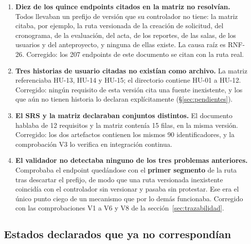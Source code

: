 \documentclass[11pt,a4paper]{article}
\begin{document}
\begin{enumerate}
    \item \textbf{Diez de los quince endpoints citados en la matriz no resolvían.} Todos
          llevaban un prefijo de versión que su controlador no tiene: la matriz citaba, por
          ejemplo, la ruta versionada de la creación de solicitud, del cronograma, de la
          evaluación, del acta, de los reportes, de las salas, de los usuarios y del
          anteproyecto, y ninguna de ellas existe. La causa raíz es RNF-26. Corregido: los 207
          endpoints de este documento se citan con la ruta real.
    \item \textbf{Tres historias de usuario citadas no existían como archivo.} La matriz
          referenciaba HU-13, HU-14 y HU-15; el directorio contiene HU-01 a HU-12. Corregido:
          ningún requisito de esta versión cita una fuente inexistente, y los que aún no tienen
          historia lo declaran explícitamente (\S\ref{sec:pendientes}).
    \item \textbf{El SRS y la matriz declaraban conjuntos distintos.} El documento hablaba de 12
          requisitos y la matriz contenía 15 filas, en la misma versión. Corregido: los dos
          artefactos contienen los mismos 90 identificadores, y la comprobación V3 lo verifica en
          integración continua.
    \item \textbf{El validador no detectaba ninguno de los tres problemas anteriores.}
          Comprobaba el endpoint quedándose con el \textbf{primer segmento} de la ruta tras
          descartar el prefijo, de modo que una ruta versionada inexistente coincidía con el
          controlador sin versionar y pasaba sin protestar. Ese era el único punto ciego de un
          mecanismo que por lo demás funcionaba. Corregido con las comprobaciones V1 a V6 y V8
          de la sección~\ref{sec:trazabilidad}.
\end{enumerate}

\subsection{Estados declarados que ya no correspondían}
\end{document}
